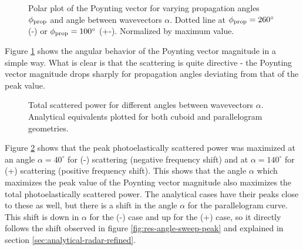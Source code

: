 \documentclass[11pt,twoside]{eitExjobb}
\begin{document}
	\begin{figure}[H]
		\centering
		\begin{subfigure}{\textwidth}
			\resizebox{\textwidth}{!}{
				
			}
		\end{subfigure}
		\begin{subfigure}{\textwidth}
			\resizebox{\textwidth}{!}{
				
			}
		\end{subfigure}
		\caption{\label{fig:res-angle-sweep-polar} Polar plot of the Poynting vector for varying propagation angles $\phi_{\mathrm{prop}}$ and angle between wavevectors $\alpha$. Dotted line at $\phi_{\mathrm{prop}} = 260^\circ$ (-) or $\phi_{\mathrm{prop}} = 100^\circ$ (+-). Normalized by maximum value.}
	\end{figure}
	Figure \ref{fig:res-angle-sweep-polar} shows the angular behavior of the Poynting vector magnitude in a simple way. What is clear is that the scattering is quite directive - the Poynting vector magnitude drops sharply for propagation angles deviating from that of the peak value.
	
	\begin{figure}[H]
		\centering
		\begin{subfigure}{\textwidth}
			\resizebox{\textwidth}{!}{
				
			}
		\end{subfigure}
		\begin{subfigure}{\textwidth}
			\resizebox{\textwidth}{!}{
				
			}
		\end{subfigure}
		\caption{\label{fig:res-angle-sweep-power-c} Total scattered power for different angles between wavevectors $\alpha$. Analytical equivalents plotted for both cuboid and parallelogram geometries.}
	\end{figure}
	Figure \ref{fig:res-angle-sweep-power-c} shows that the peak photoelastically scattered power was maximized at an angle $\alpha = 40^\circ$ for (-) scattering (negative frequency shift) and at $\alpha = 140^\circ$ for (+) scattering (positive frequency shift). This shows that the angle $\alpha$ which maximizes the peak value of the Poynting vector magnitude also maximizes the total photoelastically scattered power. The analytical cases have their peaks close to these as well, but there is a shift in the angle $\alpha$ for the parallelogram curve. This shift is down in $\alpha$ for the (-) case and up for the (+) case, so it directly follows the shift observed in figure \ref{fig:res-angle-sweep-peak} and explained in section \ref{sec:analytical-radar-refined}.
	
\end{document}
